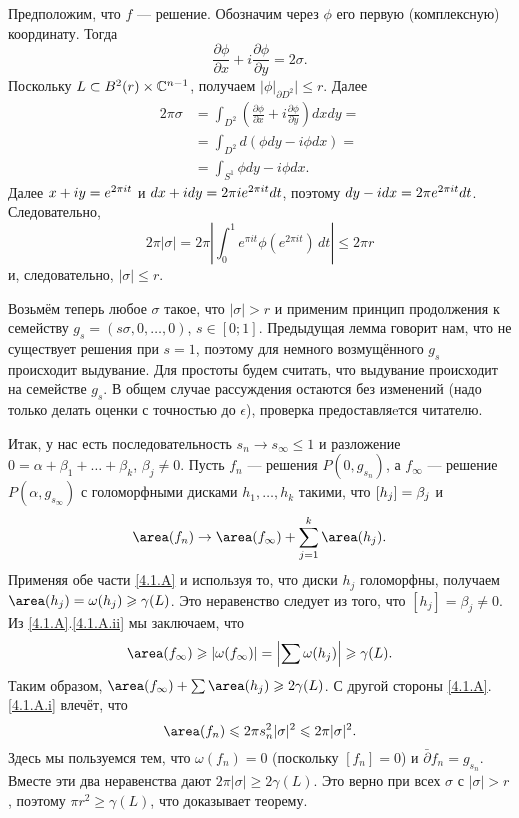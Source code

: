 Предположим, что $f$ — решение.
Обозначим через $\phi$ его первую (комплексную) координату.
Тогда 
\[\frac{\partial\phi}{\partial x}+i\frac{\partial\phi}{\partial y} = 2\sigma.\]
Поскольку $L \subset B^2 (r) \times \mathbb{C}^{n-1}$, получаем $\bigl|\phi|_{\partial D^2}\bigr|\le r$.
Далее
\begin{align*}
2\pi\sigma &= \int_{D^2}\left(\frac{\partial\phi}{\partial x}+i\frac{\partial\phi}{\partial y}\right)dxdy =
\\
&=\int_{D^2} d (\phi dy - i\phi dx)  = 
\\
&=\int_{S^1}\phi dy - i\phi dx.
\end{align*}
Далее $x + iy \z= e^{2\pi i t}$ и $dx + idy \z= 2\pi i e^{2\pi it} dt$, поэтому $dy - idx \z= 2\pi e^{2\pi i t} dt$.
Следовательно,
\[2\pi | \sigma | 
= 
2\pi\left|\int_0^1  e^{\pi i t} \phi(e^{2\pi i t})\,dt\right|
\le
2\pi r \]
и, следовательно, $| \sigma | \le r$.
\qeds


Возьмём теперь любое $\sigma$ такое, что $|\sigma|>r$ и применим принцип продолжения к семейству $g_s = (s\sigma, 0 ,\dots, 0)$, $s \in [0;1]$.
Предыдущая лемма говорит нам, что не существует решения при $s = 1$, поэтому для немного возмущённого $g_s$ происходит выдувание.
Для простоты будем считать, что выдувание происходит на семействе $g_s$.
В общем случае рассуждения остаются без изменений (надо только делать оценки с точностью до $\epsilon$), проверка предоставляeтся читателю.

Итак, у нас есть последовательность $s_n \to s_\infty \le 1$ и разложение $0 = \alpha + \beta_1 +\dots+ \beta_k$, $\beta_j \ne 0$.
Пусть $f_n$ — решения $P (0, g_{s_n})$, а $f_\infty$ — решение $P
(\alpha, g_{s_\infty})$ с голоморфными дисками $h_1,\dots,h_k$ такими, что $[h_j] \z= \beta_j$ и
\[\area (f_n)
\to 
\area (f_\infty) + \sum_{j=1}^k\area (h_j).\]
Применяя обе части \ref{4.1.A} и используя то, что диски $h_j$
голоморфны, получаем
$\area (h_j) = \omega (h_j) \ge \gamma (L)$.
Это неравенство следует из того, что $[h_j] = \beta_j \ne 0$.
Из \ref{4.1.A}.\ref{4.1.A.ii} мы заключаем, что 
\[\area (f_\infty)
\ge
|\omega(f_\infty)|
=
\left|\sum\omega (h_j)\right|
\ge
\gamma(L).\]
Таким образом, $\area (f_\infty) + \sum \area (h_j) \ge 2\gamma (L)$.
С другой стороны \ref{4.1.A}.\ref{4.1.A.i} влечёт, что 
\[\area(f_n)
\le
2\pi s^2_n|\sigma|^2
\le
2\pi|\sigma|^2.
\]
Здесь мы пользуемся тем, что $\omega (f_n) = 0$ (поскольку $[f_n] = 0$) и $\bar\partial f_n=g_{s_n}$.
Вместе эти два неравенства дают $2\pi | \sigma | \ge 2\gamma (L)$.
Это верно при всех $\sigma$ с $| \sigma | > r$, поэтому $\pi r^2 \ge \gamma (L)$, что доказывает теорему.
\qeds

